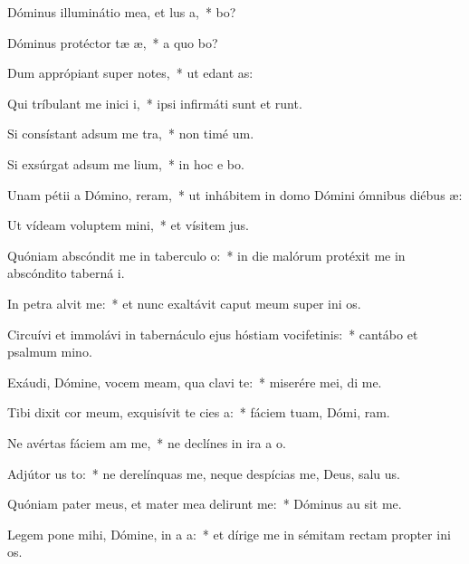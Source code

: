 \item Dóminus illuminátio mea, et lus a,~*  bo?
\item Dóminus protéctor tæ æ,~* a quo bo?
\item Dum apprópiant super  notes,~* ut edant  as:
\item Qui tríbulant me inici i,~* ipsi infirmáti sunt et runt.
\item Si consístant adsum me tra,~* non timé  um.
\item Si exsúrgat adsum me lium,~* in hoc e bo.
\item Unam pétii a Dómino,  reram,~* ut inhábitem in domo Dómini ómnibus diébus  æ:
\item Ut vídeam voluptem mini,~* et vísitem  jus.
\item Quóniam abscóndit me in taberculo o:~* in die malórum protéxit me in abscóndito taberná i.
\item In petra alvit me:~* et nunc exaltávit caput meum super ini os.
\item Circuívi et immolávi in tabernáculo ejus hóstiam vocifetinis:~* cantábo et psalmum  mino.
\item Exáudi, Dómine, vocem meam, qua clavi  te:~* miserére mei,  di me.
\item Tibi dixit cor meum, exquisívit te cies a:~* fáciem tuam, Dómi, ram.
\item Ne avértas fáciem am  me,~* ne declínes in ira a  o.
\item Adjútor us to:~* ne derelínquas me, neque despícias me, Deus, salu us.
\item Quóniam pater meus, et mater mea delirunt me:~* Dóminus au sit me.
\item Legem pone mihi, Dómine, in a a:~* et dírige me in sémitam rectam propter ini os.
